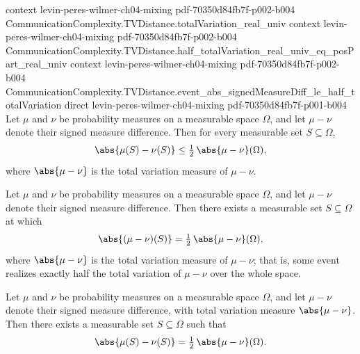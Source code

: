 \begin{lemma}
  {context}
  {levin-peres-wilmer-ch04-mixing}
  {pdf-70350d84fb7f-p002-b004}
\proofstep
  {CommunicationComplexity.TVDistance.totalVariation_real_univ}
  {context}
  {levin-peres-wilmer-ch04-mixing}
  {pdf-70350d84fb7f-p002-b004}
\proofstep
  {CommunicationComplexity.TVDistance.half_totalVariation_real_univ_eq_posPart_real_univ}
  {context}
  {levin-peres-wilmer-ch04-mixing}
  {pdf-70350d84fb7f-p002-b004}
\proofstep
  {CommunicationComplexity.TVDistance.event_abs_signedMeasureDiff_le_half_totalVariation}
  {direct}
  {levin-peres-wilmer-ch04-mixing}
  {pdf-70350d84fb7f-p001-b004}
Let $\mu$ and $\nu$ be probability measures on a measurable space $\Omega$, and let $\mu
- \nu$ denote their signed measure difference. Then for every measurable set $S
\subseteq \Omega$,
\[
\abs{\mu(S) - \nu(S)} \le \tfrac{1}{2}\,\abs{\mu - \nu}(\Omega),
\]
where $\abs{\mu - \nu}$ is the total variation measure of $\mu - \nu$.
\end{lemma}

\begin{lemma}
\label{CommunicationComplexity.TVDistance.exists_event_abs_signedMeasureDiff_eq_half_totalVariation}
\leanok
{}
Let $\mu$ and $\nu$ be probability measures on a measurable space $\Omega$, and let $\mu
- \nu$ denote their signed measure difference. Then there exists a measurable set $S
\subseteq \Omega$ at which
\[
\abs{(\mu - \nu)(S)} = \tfrac{1}{2}\,\abs{\mu - \nu}(\Omega),
\]
where $\abs{\mu - \nu}$ is the total variation measure of $\mu - \nu$; that is, some
event realizes exactly half the total variation of $\mu - \nu$ over the whole space.
\end{lemma}

\begin{lemma}
\label{CommunicationComplexity.TVDistance.exists_event_abs_measureReal_sub_eq_half_totalVariation}
\leanok
{}
Let $\mu$ and $\nu$ be probability measures on a measurable space $\Omega$, and let $\mu
- \nu$ denote their signed measure difference, with total variation measure
$\abs{\mu-\nu}$. Then there exists a measurable set $S \subseteq \Omega$ such that
\[
  \abs{\mu(S) - \nu(S)} = \tfrac{1}{2}\,\abs{\mu-\nu}(\Omega).
\]
\end{lemma}

